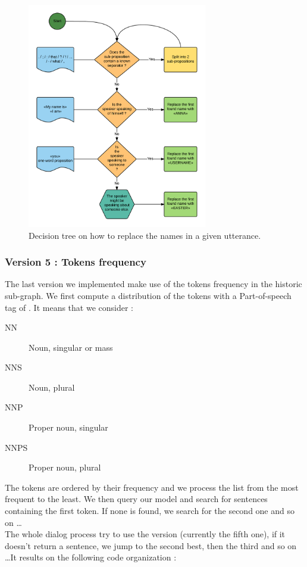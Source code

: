 \begin{figure}[!h]
\begin{center}
\includegraphics[width=0.70\textwidth]{./img/DecisionNames.png}
\end{center}
\caption{Decision tree on how to replace the names in a given utterance.}
\label{fig:NamesDecisionTree}
\end{figure}

\subsubsection{Version 5 : Tokens frequency} %
\label{ssub:version_5_tokens_frequency}
The last version we implemented make use of the tokens frequency in the historic sub-graph. We first compute a distribution of the tokens with a Part-of-speech tag of . It means that we consider :
\begin{description}
    \item[NN] Noun, singular or mass 
    \item[NNS] Noun, plural
    \item[NNP] Proper noun, singular
    \item[NNPS] Proper noun, plural
\end{description}
The tokens are ordered by their frequency and we process the list from the most frequent to the least. We then query our model and search for sentences containing the first token. If none is found, we search for the second one and so on \dots \\

The whole dialog process try to use the  version (currently the fifth one), if it doesn't return a sentence, we jump to the second best, then the third and so on \dots It results on the following code organization :

